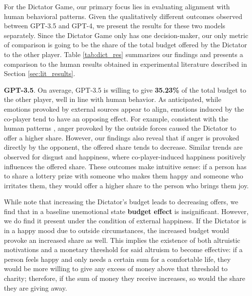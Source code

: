 \documentclass{article}
\begin{document}


For the Dictator Game, our primary focus lies in evaluating alignment with human behavioral patterns. Given the qualitatively different outcomes observed between GPT-3.5 and GPT-4, we present the results for these two models separately. Since the Dictator Game only has one decision-maker, our only metric of comparison is going to be the share of the total budget offered by the Dictator to the other player. Table \ref{tab:dict_res} summarizes our findings and presents a comparison to the human results obtained in experimental literature described in Section \ref{sec:lit_results}. 

\vspace{4pt}

\textbf{GPT-3.5}. On average, GPT-3.5 is willing to give \textbf{35.23\%} of the total budget to the other player, well in line with human behavior. As anticipated, while emotions provoked by external sources appear to align, emotions induced by the co-player tend to have an opposing effect. For example, consistent with the human patterns \cite{ANDRADE20091}, anger provoked by the outside forces caused the Dictator to offer a higher share. However, our findings also reveal that if anger is provoked directly by the opponent, the offered share tends to decrease. Similar trends are observed for disgust and happiness, where co-player-induced happiness positively influences the offered share. These outcomes make intuitive sense: if a person has to share a lottery prize with someone who makes them happy and someone who irritates them, they would offer a higher share to the person who brings them joy. 

While \cite{LARNEY201961} note that increasing the Dictator's budget leads to decreasing offers, we find that in a baseline unemotional state \textbf{budget effect} is insignificant. However, we do find it present under the condition of external happiness. If the Dictator is in a happy mood due to outside circumstances, the increased budget would provoke an increased share as well. This implies the existence of both altruistic motivations and a monetary threshold for said altruism to become effective: if a person feels happy and only needs a certain sum for a comfortable life, they would be more willing to give any excess of money above that threshold to charity; therefore, if the sum of money they receive increases, so would the share they are giving away. 
\end{document}
